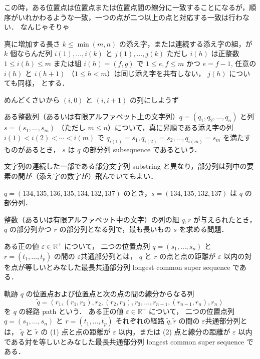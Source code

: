 \documentclass[11pt]{jarticle}
\begin{document}
この時，ある位置点は位置点または位置点間の線分に一致することになるが，順序がいれかわるような一致，一つの点が二つ以上の点と対応する一致は行わない．
なんじゃそりゃ

真に増加する長さ $k \leq \min(m, n)$ の添え字，または連続する添え字の組，が $k$ 個ならんだ列 
$i(1), \ldots, i(k)$ と $j(1), \ldots, j(k)$ 
ただし $i(h)$ は正整数 $1 \leq i(h) \leq m$ または組 $i(h) = (f, g)$ で $1 \leq e, f \leq m$ かつ $e = f-1$, 任意の $i(h)$ と $i(h+1)$ （$1 \leq h < m$）は同じ添え字を共有しない，
$j(h)$ についても同様，
とする．

めんどくさいから $(i, 0)$ と $(i, i+1)$ の列にしようず

\newpage

ある整数列（あるいは有限アルファベット上の文字列）$q = (q_1, q_2, \ldots, q_n)$ と列 $s = (s_1, \ldots, s_m)$ （ただし $m \leq n$）について，真に昇順である添え字の列 $i(1) < i(2) < \cdots < i(m)$ で $q_{i(1)} = s_1, q_{i(2)} = s_2, \ldots, q_{i(m)} = s_m$ を満たすものがあるとき，
$s$ は $q$ の部分列 subsequence であるという．

文字列の連続した一部である部分文字列 substring と異なり，部分列は列中の要素の間が（添え字の数字が）飛んでいてもよい．

\begin{example}
$q = (134, 135, 136, 135, 134, 132, 137)$ のとき，$s = (134, 135, 132, 137)$ は $q$ の部分列．
\end{example}

\begin{defn}
整数（あるいは有限アルファベット中の文字）の列の組 $q, r$ が与えられたとき，
$q$ の部分列かつ $r$ の部分列となる列で，最も長いもの $s$ を求める問題．
\end{defn}

\begin{defn}[2つの位置点列の最長共通部分列 (I)]
ある正の値 $\varepsilon \in \mathbb{R}^+$ について，
二つの位置点列 $q = (s_1, \ldots, s_n)$ と $r = (t_1, \ldots, t_p)$ の間の $\varepsilon$共通部分列とは，
 $q$ と $r$ の点と点の距離が $\varepsilon$ 以内の対を点が等しいとみなした最長共通部分列 longest common super sequence である．
\end{defn}

\begin{defn}[2つの位置点列の最長共通部分列 (II)]
軌跡 $q$ の位置点および位置点と次の点の間の線分からなる列
\[
\tilde{q} = (r_1, (r_1, r_2), r_2, (r_2, r_3), r_3, \ldots, r_{n-1}, (r_{n-1}, r_n), r_n)
\]
を $q$ の経路 path という．
ある正の値 $\varepsilon \in \mathbb{R}^+$ について，
二つの位置点列 $q = (s_1, \ldots, s_n)$ と $r = (t_1, \ldots, t_p)$ それぞれの経路 $\tilde{q}, \tilde{r}$ の間の $\varepsilon$共通部分列とは，
 $\tilde{q}$ と $\tilde{r}$ の (1) 点と点の距離が $\varepsilon$ 以内，または (2) 点と線分の距離が $\varepsilon$ 以内である対を等しいとみなした最長共通部分列 longest common super sequence である．
\end{defn}
\end{document}
